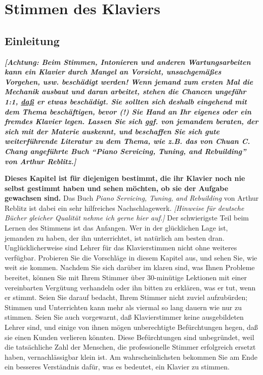 \hypertarget{c2}{}

\chapter{Stimmen des Klaviers}\hypertarget{c2_1}{}

\section{Einleitung}

\textbf{\textit{{\normalsize [Achtung: Beim Stimmen, Intonieren und anderen Wartungsarbeiten kann ein Klavier durch Mangel an Vorsicht, unsachgemäßes Vorgehen, usw. beschädigt werden!
 Wenn jemand zum ersten Mal die Mechanik ausbaut und daran arbeitet, stehen die Chancen ungefähr 1:1, \underline{daß}  er etwas beschädigt.
 Sie sollten sich deshalb eingehend mit dem Thema beschäftigen, bevor (!) Sie Hand an Ihr eigenes oder ein fremdes Klavier legen.
 Lassen Sie sich ggf. von jemandem beraten, der sich mit der Materie auskennt, und beschaffen Sie sich gute weiterführende Literatur zu dem Thema, wie z.B. das von Chuan C. Chang angeführte Buch \enquote{Piano Servicing, Tuning, and Rebuilding} von Arthur Reblitz.]}}}

\textbf{Dieses Kapitel ist für diejenigen bestimmt, die ihr Klavier noch nie selbst gestimmt haben und sehen möchten, ob sie der Aufgabe gewachsen sind.}
 Das Buch \textit{Piano Servicing, Tuning, and Rebuilding} von Arthur Reblitz ist dabei ein sehr hilfreiches Nachschlagewerk.
 \textit{[Hinweise für deutsche Bücher gleicher Qualität nehme ich gerne hier auf.]}
 Der schwierigste Teil beim Lernen des Stimmens ist das Anfangen.
 Wer in der glücklichen Lage ist, jemanden zu haben, der ihn unterrichtet, ist natürlich am besten dran.
 Unglücklicherweise sind Lehrer für das Klavierstimmen nicht ohne weiteres verfügbar.
 Probieren Sie die Vorschläge in diesem Kapitel aus, und sehen Sie, wie weit sie kommen.
 Nachdem Sie sich darüber im klaren sind, was Ihnen Probleme bereitet, können Sie mit Ihrem Stimmer über 30-minütige Lektionen mit einer vereinbarten Vergütung verhandeln oder ihn bitten zu erklären, was er tut, wenn er stimmt.
 Seien Sie darauf bedacht, Ihrem Stimmer nicht zuviel aufzubürden; Stimmen und Unterrichten kann mehr als viermal so lang dauern wie nur zu stimmen.
 Seien Sie auch vorgewarnt, daß Klavierstimmer keine ausgebildeten Lehrer sind, und einige von ihnen mögen unberechtigte Befürchtungen hegen, daß sie einen Kunden verlieren könnten.
 Diese Befürchtungen sind unbegründet, weil die tatsächliche Zahl der Menschen, die professionelle Stimmer erfolgreich ersetzt haben, vernachlässigbar klein ist.
 Am wahrscheinlichsten bekommen Sie am Ende ein besseres Verständnis dafür, was es bedeutet, ein Klavier zu stimmen.
 

